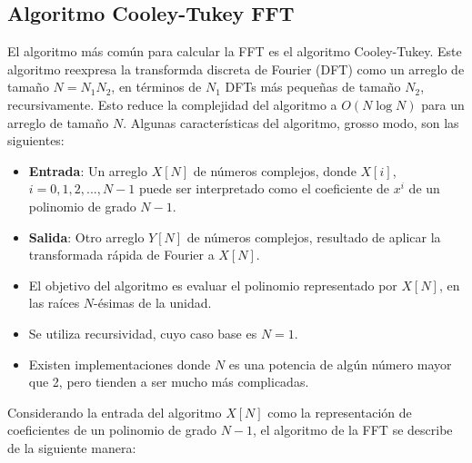 \documentclass{article}
\begin{document}
\subsection{Algoritmo Cooley-Tukey FFT}
El algoritmo más común para calcular la FFT es el algoritmo Cooley-Tukey. Este algoritmo reexpresa la transformda discreta de Fourier (DFT) como un arreglo de tamaño $N=N_{1}N_{2}$, en términos de $N_{1}$ DFTs más pequeñas de tamaño $N_{2}$, recursivamente. Esto reduce la complejidad del algoritmo a $O(N \log N)$ para un arreglo de tamaño $N$.
Algunas características del algoritmo, grosso modo, son las siguientes:
\begin{itemize}
    \item \textbf{Entrada}: Un arreglo $X[N]$ de números complejos, donde $X[i]$, $i=0,1,2,...,N-1$ puede ser interpretado como el coeficiente de $x^{i}$ de un polinomio de  grado $N-1$. 
    \item \textbf{Salida}: Otro arreglo $Y[N]$ de números complejos, resultado de aplicar la transformada rápida de Fourier a $X[N]$.
    \item El objetivo del algoritmo es evaluar el polinomio representado por $X[N]$, en las raíces $N$-ésimas de la unidad.
    \item Se utiliza recursividad, cuyo caso base es $N=1$.
    \item Existen implementaciones donde $N$ es una potencia de algún número mayor que 2, pero tienden a ser mucho más complicadas. 
\end{itemize}
Considerando la entrada del algoritmo $X[N]$ como la representación de coeficientes de un polinomio de grado $N-1$, el algoritmo de la FFT se describe de la siguiente manera:
\end{document}
